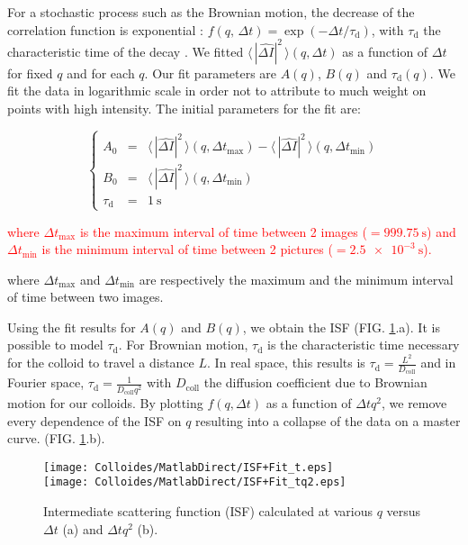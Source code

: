 \documentclass[%
 aip,
 jmp,%
 amsmath,amssymb,
reprint,%
]{revtex4-1}
\begin{document}
For a stochastic process such as the Brownian motion, the decrease of the correlation function is exponential : $ f(q, \, \Delta t) = \exp(-\Delta t/\tau_\text{d})$, with $\tau_\text{d}$ the characteristic time of the decay \citep{8_berne2000dynamic}. We fitted $\langle \, |\widehat{\Delta I}|^2 \, \rangle (q, \Delta t)$ as a function of $\Delta t$ for fixed $q$ and for each $q$. Our fit parameters are $A(q)$, $B(q)$ and $\tau_\text{d}(q)$. We fit the data in logarithmic scale in order not to attribute to much weight on points with high intensity. The initial parameters for the fit are:

\begin{equation}
\left\{
\begin{array}{rcl}
A_0 &=& \langle \, |\widehat{\Delta I}|^2 \, \rangle (q,\Delta t_\text{max}) - \langle \, |\widehat{\Delta I}|^2 \, \rangle (q,\Delta t_\text{min}) \\
B_0 &=& \langle \, |\widehat{\Delta I}|^2 \, \rangle (q,\Delta t_\text{min}) \\
\tau_\text{d} &=& \SI{1}{\second}
\end{array}
\right.
\end{equation}

\textcolor{red}{where $\Delta t_\text{max}$ is the maximum interval of time between 2 images ($ = \SI{999.75}{\second}$) and $\Delta t_\text{min}$ is the minimum interval of time between 2 pictures ($ = \SI{2.5e-3}{\second}$).}

where $\Delta t_\text{max}$ and $\Delta t_\text{min}$ are respectively the maximum and the minimum interval of time between two images.

Using the fit results for $A(q)$ and $B(q)$, we obtain the ISF (FIG. \ref{ISF}.a). It is possible to model $\tau_\text{d}$. For Brownian motion, $\tau_\text{d}$ is the characteristic time necessary for the colloid to travel a distance $L$. In real space, this results is $\tau_\text{d} = \frac{L^2}{D_\text{coll}}$ and in Fourier space, $\tau_\text{d} = \frac{1}{D_\text{coll} q^2}$ with $D_\text{coll}$ the diffusion coefficient due to Brownian motion for our colloids. By plotting $f(q, \Delta t)$ as a function of $\Delta t q^2$, we remove every dependence of the ISF on $q$ resulting into a collapse of the data on a master curve. (FIG. \ref{ISF}.b). 

\begin{figure}
	\texttt{[image: Colloides/MatlabDirect/ISF+Fit\_t.eps]}\\
	\texttt{[image: Colloides/MatlabDirect/ISF+Fit\_tq2.eps]}
	\caption{Intermediate scattering function (ISF) calculated at various $q$ versus $\Delta t$ (a) and $\Delta tq^2$ (b).}
	\label{ISF}
\end{figure}
\end{document}
